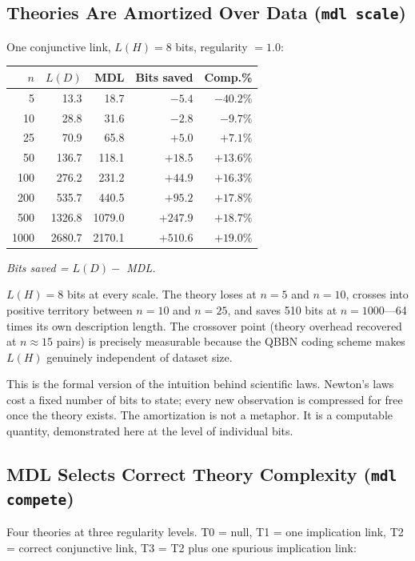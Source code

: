 \subsection{Theories Are Amortized Over Data (\texttt{mdl scale})}

One conjunctive link, $L(H) = 8$ bits, regularity $= 1.0$:

\begin{center}
\begin{tabular}{rrrrr}
\toprule
$n$ & $L(D)$ & MDL & Bits saved & Comp.\% \\
\midrule
5    &   13.3 &   18.7 &   $-5.4$ & $-40.2$\% \\
10   &   28.8 &   31.6 &   $-2.8$ &  $-9.7$\% \\
25   &   70.9 &   65.8 &   $+5.0$ &  $+7.1$\% \\
50   &  136.7 &  118.1 &  $+18.5$ & $+13.6$\% \\
100  &  276.2 &  231.2 &  $+44.9$ & $+16.3$\% \\
200  &  535.7 &  440.5 &  $+95.2$ & $+17.8$\% \\
500  & 1326.8 & 1079.0 & $+247.9$ & $+18.7$\% \\
1000 & 2680.7 & 2170.1 & $+510.6$ & $+19.0$\% \\
\bottomrule
\end{tabular}
\end{center}

\textit{Bits saved = $L(D) -$ MDL.}

$L(H) = 8$ bits at every scale. The theory loses at $n = 5$ and
$n = 10$, crosses into positive territory between $n = 10$ and $n = 25$,
and saves 510 bits at $n = 1000$---64 times its own description length.
The crossover point (theory overhead recovered at $n \approx 15$ pairs)
is precisely measurable because the QBBN coding scheme makes $L(H)$
genuinely independent of dataset size.

This is the formal version of the intuition behind scientific laws.
Newton's laws cost a fixed number of bits to state; every new
observation is compressed for free once the theory exists. The
amortization is not a metaphor. It is a computable quantity,
demonstrated here at the level of individual bits.

\subsection{MDL Selects Correct Theory Complexity (\texttt{mdl compete})}

Four theories at three regularity levels. T0 = null, T1 = one
implication link, T2 = correct conjunctive link, T3 = T2 plus one
spurious implication link:

